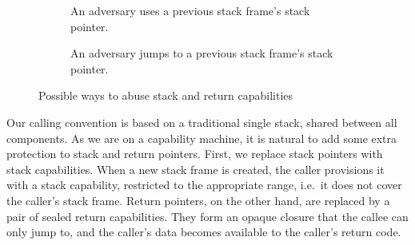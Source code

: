 \documentclass[acmsmall,review,anonymous]{acmart}\settopmatter{printfolios=true,printccs=false,printacmref=false}
\begin{document}
\begin{figure}
\begin{subfigure}{0.4\linewidth}
    \caption{An adversary uses a previous stack frame's stack pointer.}
    \label{fig:stack-ptr-abuse}
  \end{subfigure}
  \begin{subfigure}{0.18\linewidth}
    \phantom{testtestes}
  \end{subfigure}
  \begin{subfigure}{0.4\linewidth}
    \centering
    \caption{An adversary jumps to a previous stack frame's stack pointer.}
    \label{fig:ret-ptr-abuse}
  \end{subfigure}
  
  \caption{Possible ways to abuse stack and return capabilities}
  \label{fig:stack-ret-ptr-abuse}
\end{figure}

Our \stktokens{} calling convention is based on a traditional single stack, shared between all components.
As we are on a capability machine, it is natural to add some extra protection to stack and return pointers.
First, we replace stack pointers with stack capabilities.
When a new stack frame is created, the caller provisions it with a stack capability, restricted to the appropriate range, i.e.\ it does not cover the caller's stack frame.
Return pointers, on the other hand, are replaced by a pair of sealed return capabilities.
They form an opaque closure that the callee can only jump to, and the caller's data becomes available to the caller's return code. 
\end{document}
